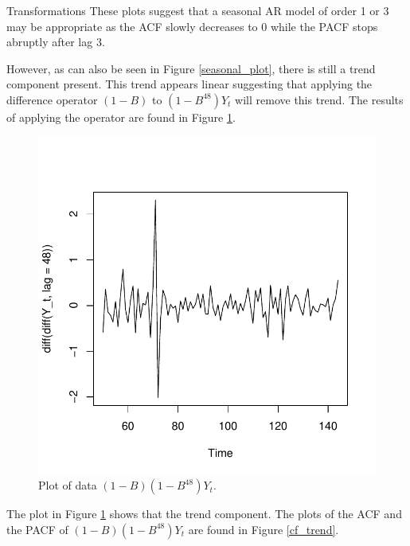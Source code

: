 \begin{subsection}{Transformations}
  These plots suggest that a seasonal AR model of order 1 or 3 may be
  appropriate as the ACF slowly decreases to 0 while the PACF stops abruptly
  after lag 3.

  However, as can also be seen in Figure \ref{seasonal_plot}, there is still a
  trend component present. This trend appears linear suggesting that applying
  the difference operator $(1 - B)$ to $\left(1 - B^{48}\right)Y_t$ will remove
  this trend. The results of applying the operator are found in Figure \ref{trend_plot}.

  \begin{figure}[!h]
    \centerline{\includegraphics[scale=0.75]{../analysis/plots/trend_plot}}
    \caption{Plot of data $(1-B)\left(1 - B^{48}\right)Y_t$.}\label{trend_plot}
  \end{figure}

  The plot in Figure \ref{trend_plot} shows that the trend component.
  The plots of the ACF and the PACF of
  $(1-B)\left(1 - B^{48}\right)Y_t$ are found in Figure \ref{cf_trend}.


\end{subsection}

